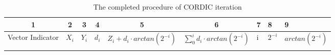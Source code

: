 \begin{landscape}
\begin{table}[!hbtp]
  \caption{The completed procedure of CORDIC iteration}
  \label{tab:WholeCordicProcedure}%
    \begin{tabular}{|l|l|r|r|l|l|l|l|l|}
    \toprule
    \multicolumn{1}{c}{1} & \multicolumn{1}{c}{2} & \multicolumn{1}{c}{3} & \multicolumn{1}{c}{4} & \multicolumn{1}{c}{5} & \multicolumn{1}{c}{6} & 7     & 8     & 9 \\
    \midrule
    Vector Indicator & $X_i$ & $Y_i$ & $d_i$ & $Z_i + d_i \cdot arctan(2^{-i})$ & $\sum_{0}^{i} d_i \cdot arctan(2^{-i})$ & i & $2^{-i}$ & $arctan(2^{-i})$ \\
    \multicolumn{1}{c}{} &       &       &       &       &       &       &       &  \\

    


\end{tabular}
\end{table}
\end{landscape}
